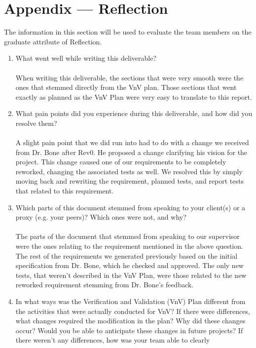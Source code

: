 \documentclass[12pt, titlepage]{article}
\begin{document}
\newpage{}
\section*{Appendix --- Reflection}

The information in this section will be used to evaluate the team members on the
graduate attribute of Reflection.

\begin{enumerate}
  \item What went well while writing this deliverable? \\
  \\
  When writing this deliverable, the sections that were very smooth were the ones that stemmed directly from the VnV plan. Those sections that went exactly as planned as the VnV Plan were very easy to translate to this report.
  \item What pain points did you experience during this deliverable, and how
    did you resolve them? \\
  \\
  A slight pain point that we did run into had to do with a change we received from Dr. Bone after Rev0. He proposed a change clarifying his vision for the project. This change caused one of our requirements to be completely reworked, changing the associated tests as well. We resolved this by simply moving back and rewriting the requirement, planned tests, and report tests that related to this requirement.
  \item Which parts of this document stemmed from speaking to your client(s) or
  a proxy (e.g. your peers)? Which ones were not, and why?\\
  \\
  The parts of the document that stemmed from speaking to our supervisor were the ones relating to the requirement mentioned in the above question. The rest of the requirements we generated previously based on the initial specification from Dr. Bone, which he checked and approved. The only new tests, that weren't described in the VnV Plan, were those related to the new reworked requirement stemming from Dr. Bone's feedback.
  \item In what ways was the Verification and Validation (VnV) Plan different
  from the activities that were actually conducted for VnV?  If there were
  differences, what changes required the modification in the plan?  Why did
  these changes occur?  Would you be able to anticipate these changes in future
  projects?  If there weren't any differences, how was your team able to clearly

\end{enumerate}
\end{document}
